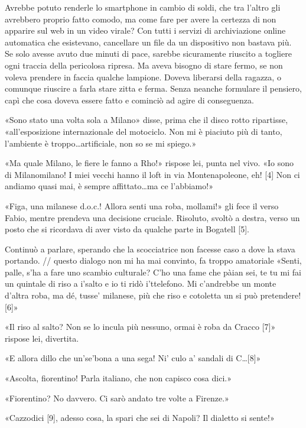 Avrebbe potuto renderle lo smartphone in cambio di soldi, che tra l'altro gli avrebbero proprio fatto comodo, ma come fare per avere la certezza di non apparire sul web in un video virale? Con tutti i servizi di archiviazione online automatica che esistevano, cancellare un file da un dispositivo non bastava più. Se solo avesse avuto due minuti di pace, sarebbe sicuramente riuscito a togliere ogni traccia della pericolosa ripresa. Ma aveva bisogno di stare fermo, se non voleva prendere in faccia qualche lampione. Doveva liberarsi della ragazza, o comunque riuscire a farla stare zitta e ferma. Senza neanche formulare il pensiero, capì che cosa doveva essere fatto e cominciò ad agire di conseguenza.

«Sono stato una volta sola a Milano» disse, prima che il disco rotto ripartisse, «all'esposizione internazionale del motociclo. Non mi è piaciuto più di tanto, l'ambiente è troppo\ldots artificiale, non so se mi spiego.»

«Ma quale Milano, le fiere le fanno a Rho!» rispose lei, punta nel vivo. «Io sono di Milanomilano! I miei vecchi hanno il loft in via Montenapoleone, eh! [4] Non ci andiamo quasi mai, è sempre affittato\ldots ma ce l'abbiamo!»

«Figa, una milanese d.o.c.! Allora senti una roba, mollami!» gli fece il verso Fabio, mentre prendeva una decisione cruciale. Risoluto, svoltò a destra, verso un posto che si ricordava di aver visto da qualche parte in Bogatell [5].

Continuò a parlare, sperando che la scocciatrice non facesse caso a dove la stava portando.
// questo dialogo non mi ha mai convinto, fa troppo amatoriale
«Senti, palle, s'ha a fare uno scambio culturale? C'ho una fame che pàian sei, te tu mi fai un quintale di riso a i'salto e io ti ridò i'ttelefono. Mi c'andrebbe un monte d'altra roba, ma dé, tusse' milanese, più che riso e cotoletta un si può pretendere! [6]»

«Il riso al salto? Non se lo incula più nessuno, ormai è roba da Cracco [7]» rispose lei, divertita.

«E allora dillo che un'se'bona a una sega! Ni' culo a' sandali di C\ldots [8]»

«Ascolta, fiorentino! Parla italiano, che non capisco cosa dici.»

«Fiorentino? No davvero. Ci sarò andato tre volte a Firenze.»

«Cazzodici [9], adesso cosa, la spari che sei di Napoli? Il dialetto si sente!»

